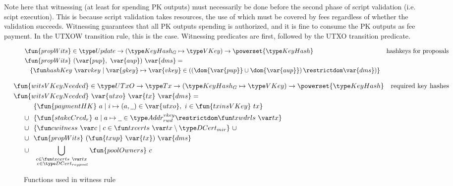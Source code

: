 Note here that witnessing (at least for spending PK outputs) must necessarily
be done before the second phase of script validation (i.e. scipt execution).
This is because script validation takes resources, the use of which must
be covered by fees regardless of whether the validation succeeds. Witnessing
guarantees that all PK outputs spending is authorized, and it is fine to
consume the PK outputs as fee payment. In the UTXOW transition rule,
this is the case. Witnessing predicates are first, followed by the UTXO transition
predicate.

\begin{figure}[htb]
  \begin{align*}
    & \fun{propWits} \in \Update \to (\KeyHashGen\mapsto\VKey) \to \powerset{\KeyHash}
    & \text{hashkeys for proposals} \\
    & \fun{propWits}~(\var{pup},~\var{aup})~\var{dms} = \\
    & ~~\left\{
      \hashKey{vkey}
      \mid
      \var{gkey}\mapsto\var{vkey}\in
      \left(\left(\dom{\var{pup}}\cup\dom{\var{aup}}\right)\restrictdom\var{dms}\right)
      \right\}
  \end{align*}

    \begin{align*}
    & \hspace{-0.8cm}\fun{witsVKeyNeeded} \in \UTxO \to \Tx \to (\KeyHashGen\mapsto\VKey) \to
      \powerset{\KeyHash}
    & \text{required key hashes} \\
    &  \hspace{-0.8cm}\fun{witsVKeyNeeded}~\var{utxo}~\var{tx}~\var{dms} = \\
    & ~~\{ \fun{paymentHK}~a \mid i \mapsto (a, \wcard) \in \var{utxo},~i\in\fun{txinsVKey}~{tx} \} \\
    \cup & ~~
           \{\fun{stakeCred_r}~a\mid a\mapsto \wcard \in \AddrRWDVKey
      \restrictdom \txwdrls{tx}\}\\
    \cup & ~~\{\cwitness{c} \mid c \in \txcerts{tx} \setminus \DCertMir\}~\cup \\
    \cup & ~~\fun{propWits}~(\fun{txup}~\var{tx})~\var{dms} \\
    \cup & ~~\bigcup_{\substack{c \in \txcerts{tx} \\ ~c \in\DCertRegPool}} \fun{poolOwners}~{c}
  \end{align*}
  \caption{Functions used in witness rule}
  \label{fig:functions-witnesses}
\end{figure}


